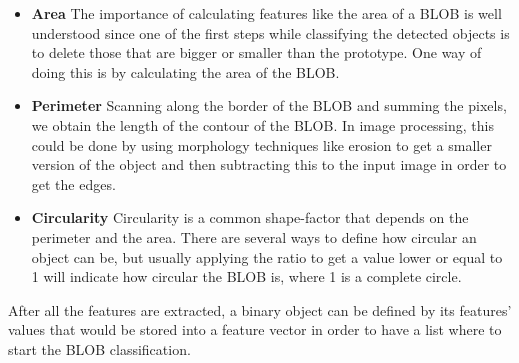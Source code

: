 \begin{itemize}
\item \textbf{Area}
The importance of calculating features like the area of a BLOB is well understood since one of the first steps while classifying the detected objects is to delete those that are bigger or smaller than the prototype. One way of doing this is by calculating the area of the BLOB.
\item \textbf{Perimeter}
Scanning along the border of the BLOB and summing the pixels, we obtain the length of the contour of the BLOB. In image processing, this could be done by using morphology techniques like erosion to get a smaller version of the object and then subtracting this to the input image in order to get the edges.
\item \textbf{Circularity}
Circularity is a common shape-factor that depends on the perimeter and the area. There are several ways to define how circular an object can be, but usually applying the ratio to get a value lower or equal to 1 will indicate how circular the BLOB is, where 1 is a complete circle.
\end{itemize}

After all the features are extracted, a binary object can be defined by its features' values that would be stored into a feature vector in order to have a list where to start the BLOB classification.


